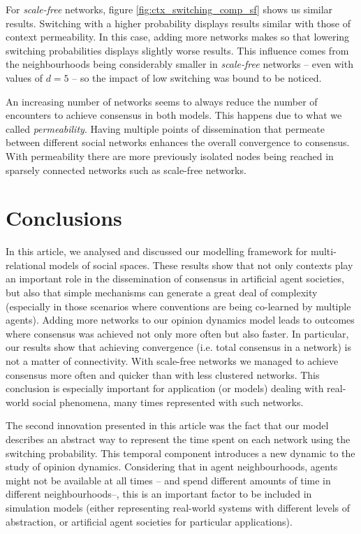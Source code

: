 \documentclass[preprint,number]{elsarticle}
\begin{document}
      For \textit{scale-free} networks, figure \ref{fig:ctx_switching_comp_sf} shows us similar
      results. Switching with a higher probability displays results similar with those of context
      permeability. In this case, adding more networks makes so that lowering switching
      probabilities displays slightly worse results. This influence comes from the neighbourhoods
      being considerably smaller in \textit{scale-free} networks -- even with values of $d=5$ -- so
      the impact of low switching was bound to be noticed.

      An increasing number of networks seems to always reduce the number of encounters to achieve
      consensus in both models. This happens due to what we called \textit{permeability}. Having
      multiple points of dissemination that permeate between different social networks enhances the
      overall convergence to consensus. With permeability there are more previously isolated nodes
      being reached in sparsely connected networks such as scale-free networks.

      \section{Conclusions}
      \label{sec:conclusion-future}
      \noindent In this article, we analysed and discussed our modelling framework for
      multi-relational models of social spaces. These results show that not only contexts play an
      important role in the dissemination of consensus in artificial agent societies, but also that
      simple mechanisms can generate a great deal of complexity (especially in those scenarios where
      conventions are being co-learned by multiple agents). Adding more networks to our opinion
      dynamics model leads to outcomes where consensus was achieved not only more often but also
      faster. In particular, our results show that achieving convergence (i.e. total consensus in a
      network) is not a matter of connectivity. With scale-free networks we managed to achieve
      consensus more often and quicker than with less clustered networks. This conclusion is
      especially important for application (or models) dealing with real-world social phenomena,
      many times represented with such networks.

      The second innovation presented in this article was the fact that our model describes an
      abstract way to represent the time spent on each network using the switching probability. This
      temporal component introduces a new dynamic to the study of opinion dynamics. Considering that
      in agent neighbourhoods, agents might not be available at all times -- and spend different
      amounts of time in different neighbourhoods--, this is an important factor to be included in
      simulation models (either representing real-world systems with different levels of
      abstraction, or artificial agent societies for particular applications).
\end{document}
